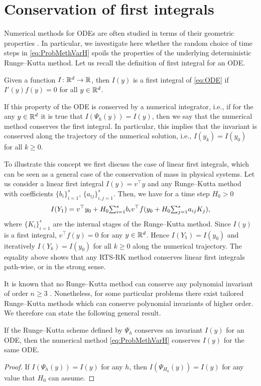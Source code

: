 \documentclass[10pt]{article}
\begin{document}
\section{Conservation of first integrals}\label{sec:GeomProperties}
Numerical methods for ODEs are often studied in terms of their geometric properties \cite{HLW06}. In particular, we investigate here whether the random choice of time steps in \eqref{eq:ProbMethVarH} spoils the properties of the underlying deterministic Runge--Kutta method. Let us recall the definition of first integral for an ODE.
\begin{definition} Given a function $I\colon\mathbb{R}^d\to\mathbb{R}$, then $I(y)$ is a first integral of \eqref{eq:ODE} if $I'(y)f(y) = 0$ for all $y \in \mathbb{R}^d$. 
\end{definition}	
If this property of the ODE is conserved by a numerical integrator, i.e., if for the any $y\in\mathbb{R}^d$ it is true that $I(\Psi_h(y)) = I(y)$, then we say that the numerical method conserves the first integral. In particular, this implies that the invariant is conserved along the trajectory of the numerical solution, i.e., $I(y_k) = I(y_0)$ for all $k\geq 0$.
	
\begin{example} To illustrate this concept we first discuss the case of linear first integrals, which can be seen as a general case of the conservation of mass in physical systems. Let us consider a linear first integral $I(y) = v^\top y$ and any Runge--Kutta method with coefficients $\{b_i\}_{i=1}^s$, $\{a_{ij}\}_{i,j=1}^s$. Then, we have for a time step $H_0 > 0$
	\begin{equation}
		I(Y_1) = v^\top y_0 + H_0 {\textstyle\sum}_{i=1}^s b_iv^\top f(y_0 + H_0{\textstyle\sum}_{j=1}^{s} a_{ij}K_j),
	\end{equation}
	where $\{K_i\}_{i=1}^s$ are the internal stages of the Runge--Kutta method. Since $I(y)$ is a first integral, $v^\top f(y) = 0$ for any $y \in \mathbb{R}^d$. Hence $I(Y_1)  = I(y_0)$ and iteratively $I(Y_k) = I(y_0)$ for all $k \geq 0$ along the numerical trajectory. The equality above shows that any RTS-RK method conserves linear first integrals path-wise, or in the strong sense. 
\end{example}

It is known that no Runge--Kutta method can conserve any polynomial invariant of order $n \geq 3$ \cite[Theorem IV.3.3]{HLW06}. Nonetheless, for some particular problems there exist tailored Runge--Kutta methods which can conserve polynomial invariants of higher order. We therefore can state the following general result.
\begin{theorem}\label{thm:PolyInvariants} If the Runge--Kutta scheme defined by $\Psi_h$ conserves an invariant $I(y)$ for an ODE, then the numerical method \eqref{eq:ProbMethVarH} conserves $I(y)$ for the same ODE.
\end{theorem}
\begin{proof} If $I(\Psi_h(y)) = I(y)$ for any $h$, then $I(\Psi_{H_0}(y)) = I(y)$ for any value that $H_0$ can assume.
\end{proof}
\end{document}
